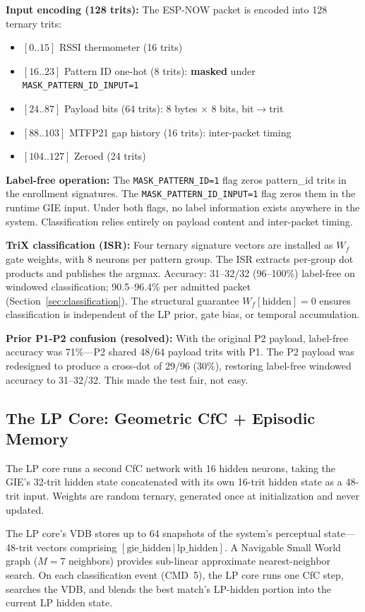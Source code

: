 \documentclass[11pt,letterpaper]{article}
\begin{document}
\textbf{Input encoding (128 trits):} The ESP-NOW packet is encoded into 128 ternary trits:
\begin{itemize}
\item $[0..15]$ RSSI thermometer (16 trits)
\item $[16..23]$ Pattern ID one-hot (8 trits): \textbf{masked} under \texttt{MASK\_PATTERN\_ID\_INPUT=1}
\item $[24..87]$ Payload bits (64 trits): 8 bytes $\times$ 8 bits, bit$\to$trit
\item $[88..103]$ MTFP21 gap history (16 trits): inter-packet timing
\item $[104..127]$ Zeroed (24 trits)
\end{itemize}

\textbf{Label-free operation:} The \texttt{MASK\_PATTERN\_ID=1} flag zeros pattern\_id trits in the enrollment signatures. The \texttt{MASK\_PATTERN\_ID\_INPUT=1} flag zeros them in the runtime GIE input. Under both flags, no label information exists anywhere in the system. Classification relies entirely on payload content and inter-packet timing.

\textbf{TriX classification (ISR):} Four ternary signature vectors are installed as $W_f$ gate weights, with 8 neurons per pattern group. The ISR extracts per-group dot products and publishes the argmax. Accuracy: 31--32/32 (96--100\%) label-free on windowed classification; 90.5--96.4\% per admitted packet (Section~\ref{sec:classification}). The structural guarantee $W_f[\text{hidden}] = 0$ ensures classification is independent of the LP prior, gate bias, or temporal accumulation.

\textbf{Prior P1-P2 confusion (resolved):} With the original P2 payload, label-free accuracy was 71\%---P2 shared 48/64 payload trits with P1. The P2 payload was redesigned to produce a cross-dot of 29/96 (30\%), restoring label-free windowed accuracy to 31--32/32. This made the test fair, not easy.

\subsection{The LP Core: Geometric CfC + Episodic Memory}

The LP core runs a second CfC network with 16 hidden neurons, taking the GIE's 32-trit hidden state concatenated with its own 16-trit hidden state as a 48-trit input. Weights are random ternary, generated once at initialization and never updated.

The LP core's VDB stores up to 64 snapshots of the system's perceptual state---48-trit vectors comprising $[\text{gie\_hidden}\,|\,\text{lp\_hidden}]$. A Navigable Small World graph ($M=7$ neighbors) provides sub-linear approximate nearest-neighbor search. On each classification event (CMD~5), the LP core runs one CfC step, searches the VDB, and blends the best match's LP-hidden portion into the current LP hidden state.
\end{document}
